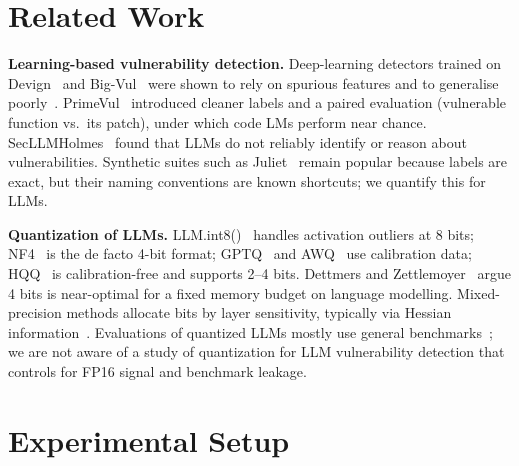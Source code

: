 \documentclass[conference]{IEEEtran}
\begin{document}
\section{Related Work}
\textbf{Learning-based vulnerability detection.} Deep-learning detectors trained on Devign~\cite{zhou2019devign} and Big-Vul~\cite{fan2020bigvul} were shown to rely on spurious features and to generalise poorly~\cite{chakraborty2021deep,risse2024limits}. PrimeVul~\cite{ding2024primevul} introduced cleaner labels and a paired evaluation (vulnerable function vs.\ its patch), under which code LMs perform near chance. SecLLMHolmes~\cite{ullah2024secllmholmes} found that LLMs do not reliably identify or reason about vulnerabilities. Synthetic suites such as Juliet~\cite{boland2012juliet} remain popular because labels are exact, but their naming conventions are known shortcuts; we quantify this for LLMs.

\textbf{Quantization of LLMs.} LLM.int8()~\cite{dettmers2022llmint8} handles activation outliers at 8 bits; NF4~\cite{dettmers2023qlora} is the de facto 4-bit format; GPTQ~\cite{frantar2023gptq} and AWQ~\cite{lin2024awq} use calibration data; HQQ~\cite{badri2023hqq} is calibration-free and supports 2--4 bits. Dettmers and Zettlemoyer~\cite{dettmers2023case} argue 4 bits is near-optimal for a fixed memory budget on language modelling. Mixed-precision methods allocate bits by layer sensitivity, typically via Hessian information~\cite{dong2019hawq}. Evaluations of quantized LLMs mostly use general benchmarks~\cite{jin2024comprehensive}; we are not aware of a study of quantization for LLM vulnerability detection that controls for FP16 signal and benchmark leakage.

\section{Experimental Setup}
\end{document}
